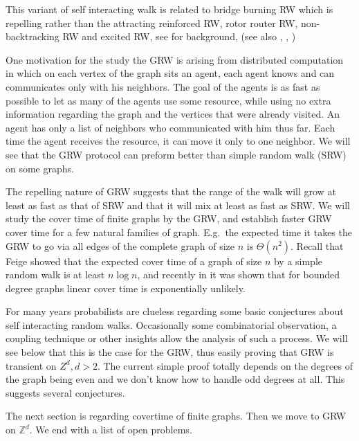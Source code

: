 \documentclass[12pt,a4paper]{article}
\newcommand{\0}{{\bf 0}}
\newcommand{\Z}{{\mathbb Z}}
\begin{document}
This variant of self interacting walk is related to bridge burning RW
which is repelling rather than the attracting reinforced RW, rotor
router RW, non-backtracking RW and excited RW, see \cite{Pem07} for background,
(see also \cite{FrSa10}, \cite{ABLS06}, \cite{BW03})

One motivation for the study the GRW is arising from distributed computation in which on each vertex of the graph sits an agent,
each agent knows and can communicates only with his neighbors.
The goal of the agents is as fast as possible to let as many of the agents use some resource,
while using no extra information regarding the graph and the vertices that were already visited.
An agent has only a list of neighbors who communicated with him thus far.
Each time the agent receives the resource, it can move it only to one neighbor.
We will see that  the GRW protocol can preform better than simple random walk (SRW) on some graphs.

The repelling nature of GRW suggests that the range of the walk will
grow at least as fast as that of SRW and that it will mix at least as fast as SRW.
We will study the cover time of finite graphs by the GRW, and
establish faster GRW cover time for a few natural families of graph.
E.g.\ the expected time it takes the GRW to go via all edges
of the complete graph of size $n$ is $\Theta(n^2)$.
Recall that Feige \cite{Feige95lowerbound} showed that the expected cover time of a
graph of size $n$ by a simple random walk is at least $n \log n$,
and recently in \cite{BGM} it was shown that for bounded degree graphs linear cover time is
exponentially unlikely.

For many years probabilists are clueless regarding some
basic conjectures about self interacting random walks. Occasionally
some combinatorial observation, a coupling technique
or other insights allow the analysis of such a process. We will see
below that this is the case for the GRW, thus easily proving that
GRW is transient on $Z^d, d >2$. The current simple proof totally
depends on the degrees of the graph being even and we don't know
how to handle odd degrees at all. This suggests several conjectures.
\medskip


\medskip

The next section is regarding covertime of finite graphs. Then we move to GRW on $\Z^d$.
We end with a list of open problems.






\end{document}
